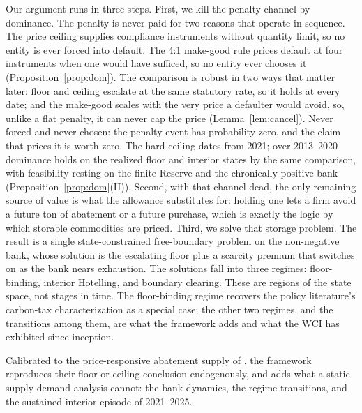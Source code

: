 \documentclass[11pt,letterpaper]{article}
\theoremstyle{plain}
\theoremstyle{definition}
\numberwithin{equation}{section}
\begin{document}
Our argument runs in three steps. First, we kill the penalty channel by dominance. The penalty is never paid for two reasons that operate in sequence. The price ceiling supplies compliance instruments without quantity limit, so no entity is ever forced into default. The 4:1 make-good rule prices default at four instruments when one would have sufficed, so no entity ever chooses it (Proposition~\ref{prop:dom}). The comparison is robust in two ways that matter later: floor and ceiling escalate at the same statutory rate, so it holds at every date; and the make-good scales with the very price a defaulter would avoid, so, unlike a flat penalty, it can never cap the price (Lemma~\ref{lem:cancel}). Never forced and never chosen: the penalty event has probability zero, and the claim that prices it is worth zero. The hard ceiling dates from 2021; over 2013--2020 dominance holds on the realized floor and interior states by the same comparison, with feasibility resting on the finite Reserve and the chronically positive bank (Proposition~\ref{prop:dom}(II)). Second, with that channel dead, the only remaining source of value is what the allowance substitutes for: holding one lets a firm avoid a future ton of abatement or a future purchase, which is exactly the logic by which storable commodities are priced. Third, we solve that storage problem. The result is a single state-constrained free-boundary problem on the non-negative bank, whose solution is the escalating floor plus a scarcity premium that switches on as the bank nears exhaustion. The solutions fall into three regimes: floor-binding, interior Hotelling, and boundary clearing. These are regions of the state space, not stages in time. The floor-binding regime recovers the policy literature's carbon-tax characterization as a special case; the other two regimes, and the transitions among them, are what the framework adds and what the WCI has exhibited since inception.

Calibrated to the price-responsive abatement supply of \citet{borenstein2019}, the framework reproduces their floor-or-ceiling conclusion endogenously, and adds what a static supply-demand analysis cannot: the bank dynamics, the regime transitions, and the sustained interior episode of 2021--2025.
\end{document}
